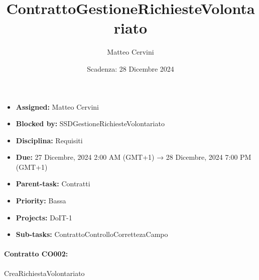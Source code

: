 \title{ContrattoGestioneRichiesteVolontariato}
\author{Matteo Cervini}
\date{Scadenza: 28 Dicembre 2024}

\maketitle

\begin{itemize}
  \item \textbf{Assigned:} Matteo Cervini
  \item \textbf{Blocked by:} SSDGestioneRichiesteVolontariato
  \item \textbf{Disciplina:} Requisiti
  \item \textbf{Due:} 27 Dicembre, 2024 2:00 AM (GMT+1) → 28 Dicembre, 2024 7:00 PM (GMT+1)
  \item \textbf{Parent-task:} Contratti
  \item \textbf{Priority:} Bassa
  \item \textbf{Projects:} DoIT-1
  \item \textbf{Sub-tasks:} ContrattoControlloCorrettezaCampo
\end{itemize}

\vspace{0.5cm}

\noindent
\paragraph*{Contratto \textbf{CO002}:} CreaRichiestaVolontariato

